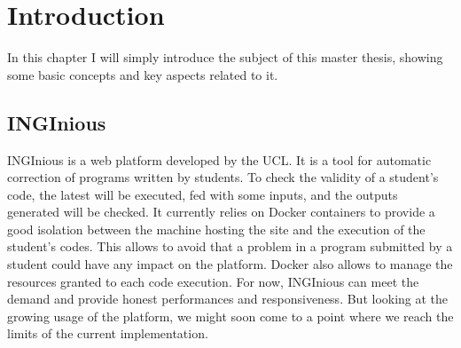 \chapter{Introduction}

In this chapter I will simply introduce the subject of this master thesis, showing some basic concepts and key aspects related to it.

\section{INGInious}

INGInious is a web platform developed by the UCL.  It is a tool for automatic correction of programs written by students. To check the validity of a student's code, the latest will be executed, fed with some inputs, and the outputs generated will be checked. It currently relies on Docker containers to provide a good isolation between the machine hosting the site and the execution of the student's codes.  This allows to avoid that a problem in a program submitted by a student could have any impact on the platform.  Docker also allows to manage the resources granted to each code execution.  For now, INGInious can meet the demand and provide honest performances and responsiveness.  But looking at the growing usage of the platform, we might soon come to a point where we reach the limits of the current implementation.

